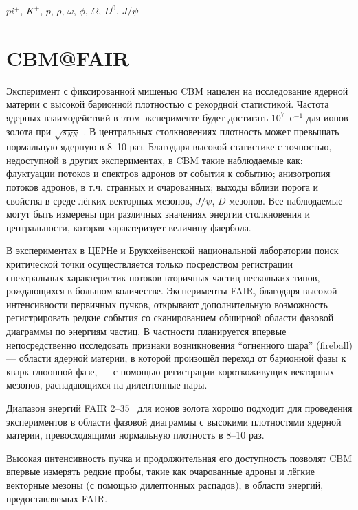 $pi^{+}$, $K^{+}$, $p$, $\rho$, $\omega$, $\phi$, $\Omega$, $D^{0}$, $J/\psi$




\section{CBM@FAIR}

Эксперимент с фиксированной мишенью CBM нацелен на исследование ядерной материи с высокой барионной плотностью с рекордной статистикой. Частота ядерных взаимодействий в этом эксперименте будет достигать $10^7$~с$^{-1}$ для ионов золота при $\sqrt{s_{NN}}$ \todo. В центральных столкновениях плотность может превышать нормальную ядерную в 8--10 раз. Благодаря высокой статистике с точностью, недоступной в других экспериментах, в CBM \todo такие наблюдаемые как: флуктуации потоков и спектров адронов от события к событию; анизотропия потоков адронов, в т.ч. странных и очарованных; выходы вблизи порога и свойства в среде лёгких векторных мезонов, $J/\psi$, $D$-мезонов. Все наблюдаемые могут быть измерены при различных значениях энергии столкновения и центральности, которая характеризует величину фаербола.

В экспериментах в ЦЕРНе и Брукхейвенской национальной лаборатории поиск критической точки осуществляется только посредством регистрации спектральных характеристик потоков вторичных частиц нескольких типов, рождающихся в большом количестве. Эксперименты FAIR, благодаря высокой интенсивности первичных пучков, открывают дополнительную возможность регистрировать редкие события со сканированием обширной области фазовой диаграммы по энергиям частиц. В частности планируется впервые непосредственно исследовать признаки возникновения ``огненного шара'' (fireball) --- области ядерной материи, в которой произошёл переход от барионной фазы к кварк-глюонной фазе, --- с помощью регистрации короткоживущих векторных мезонов, распадающихся на дилептонные пары.

Диапазон энергий FAIR 2--35~\GeVperNucl{} для ионов золота хорошо подходит для проведения экспериментов в области фазовой диаграммы с высокими плотностями ядерной материи, превосходящими нормальную плотность в 8--10 раз.

Высокая интенсивность пучка и продолжительная его доступность позволят CBM впервые измерять редкие пробы, такие как очарованные адроны и лёгкие векторные мезоны (с помощью дилептонных распадов), в области энергий, предоставляемых FAIR.

